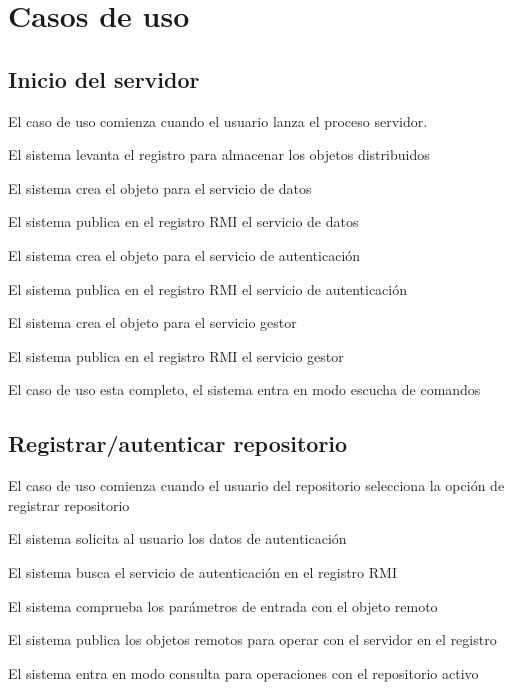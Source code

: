 \chapter{Casos de uso}

\section{Inicio del servidor}

\begin{compactenum}
	\item El caso de uso comienza cuando el usuario lanza el proceso servidor.
	\item El sistema levanta el registro para almacenar los objetos distribuidos
	\item El sistema crea el objeto para el servicio de datos
	\item El sistema publica en el registro RMI el servicio de datos
	\item El sistema crea el objeto para el servicio de autenticación
	\item El sistema publica en el registro RMI el servicio de autenticación
	\item El sistema crea el objeto para el servicio gestor
	\item El sistema publica en el registro RMI el servicio gestor
	\item El caso de uso esta completo, el sistema entra en modo escucha de comandos
\end{compactenum}

\section{Registrar/autenticar repositorio}

\begin{compactenum}
	\item El caso de uso comienza cuando el usuario del repositorio selecciona la opción de registrar repositorio
	\item El sistema solicita al usuario los datos de autenticación
	\item El sistema busca el servicio de autenticación en el registro RMI
	\item El sistema comprueba los parámetros de entrada con el objeto remoto
	\item El sistema publica los objetos remotos para operar con el servidor en el registro
	\item El sistema entra en modo consulta para operaciones con el repositorio activo
\end{compactenum}

